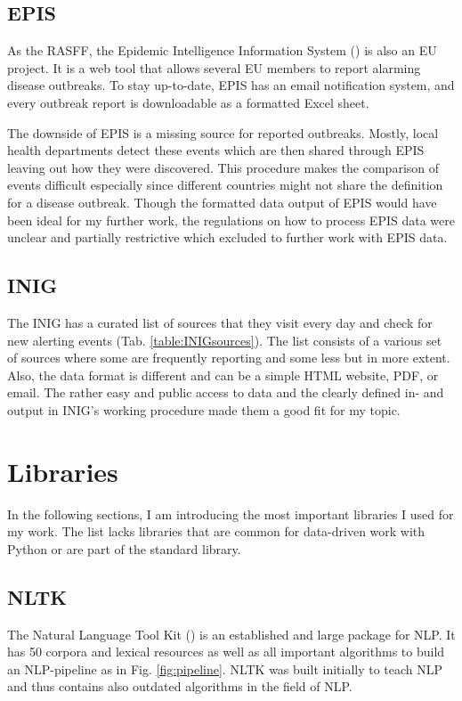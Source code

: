 \subsection{EPIS}
As the RASFF, the Epidemic Intelligence Information System () is also an EU project. It is a web tool that allows several EU members to report alarming disease outbreaks. To stay up-to-date, EPIS has an email notification system, and every outbreak report is downloadable as a formatted Excel sheet.

The downside of EPIS is a missing source for reported outbreaks. Mostly, local health departments detect these events which are then shared through EPIS leaving out how they were discovered. This procedure makes the comparison of events difficult especially since different countries might not share the definition for a disease outbreak.
Though the formatted data output of EPIS would have been ideal for my further work, the regulations on how to process EPIS data were unclear and partially restrictive which excluded to further work with EPIS data.

\subsection{INIG}\label{INIGsources}
The INIG has a curated list of sources that they visit every day and check for new alerting events (Tab. \ref{table:INIGsources}).
The list consists of a various set of sources where some are frequently reporting and some less but in more extent. Also, the data format is different and can be a simple HTML website, PDF, or email.
The rather easy and public access to data and the clearly defined in- and output in INIG's working procedure made them a good fit for my topic.

\section{Libraries}
In the following sections, I am introducing the most important libraries I used for my work.
The list lacks libraries that are common for data-driven work with Python or are part of the standard library.

\subsection{NLTK}
The Natural Language Tool Kit () is an established and large package for NLP.
It has 50 corpora and lexical resources as well as all important algorithms to build an NLP-pipeline as in Fig. \ref{fig:pipeline}.
NLTK was built initially to teach NLP and thus contains also outdated algorithms in the field of NLP.

